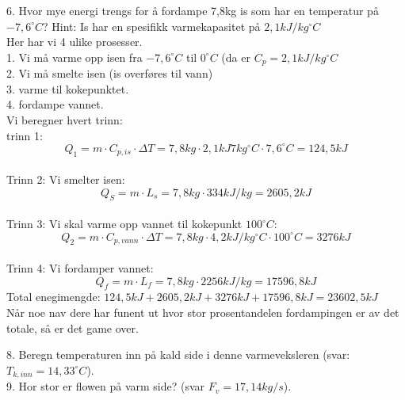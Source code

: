 \documentclass{minmal}
\begin{document}
6. Hvor mye energi trengs for å fordampe 7,8kg is som har en temperatur på $-7,6^\circ C$?  Hint: Is har en spesifikk varmekapasitet på $2,1kJ/kg^\circ C$\\
Her har vi 4 ulike prosesser.  \\
1. Vi må varme opp isen fra $-7,6^\circ C$ til $0^\circ C$  (da er  $C_p=2,1kJ/kg^\circ  C$\\
2. Vi må smelte isen (is overføres til vann)\\
3. varme til kokepunktet.\\
4. fordampe vannet. \\
Vi beregner hvert trinn:\\
trinn 1:  
$$Q_1=m\cdot C_{p,is}\cdot \Delta T=7,8kg\cdot 2,1kJ7kg^\circ  C\cdot 7,6^\circ C=124,5kJ $$\\
Trinn 2: Vi smelter isen:
$$Q_S=m\cdot L_s=7,8kg\cdot 334kJ/kg=2605,2kJ$$\\
Trinn 3: Vi skal varme opp vannet til kokepunkt $100^\circ C$: \\
$$Q_2=m\cdot C_{p,vann}\cdot \Delta T=7,8kg\cdot 4,2kJ/kg^\circ C\cdot 100^\circ C=3276kJ$$\\
Trinn 4: Vi fordamper vannet:\\
$$Q_f=m\cdot L_f=7,8kg\cdot 2256kJ/kg=17596,8kJ$$
Total enegimengde: $124,5kJ+2605,2kJ+3276kJ+17596,8kJ=23602,5kJ$\\
Når noe nav dere har funent ut hvor stor prosentandelen fordampingen er av det totale,  så er det game over.

8. Beregn temperaturen inn på kald side i denne varmeveksleren (svar: $T_{k,inn}=14,33^\circ C$).\\
9.  Hor stor er flowen på varm side? (svar $F_v=17,14kg/s$).\nl[2]
\newpage
{}
\end{document}
